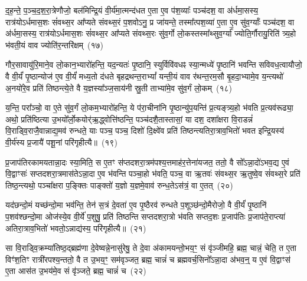द॒ह॒न्ते॒ प॒ञ्च॒द॒श॒रा॒त्रेणौजो॒ बल॑मिन्द्रि॒यं वी॒र्य॑मा॒त्मन्द॑धत ए॒ता ए॒व प॑श॒व्याः᳚ पञ्च॑दश॒ वा अ॑र्धमा॒सस्य॒ रात्र॑यो\-ऽ\-र्धमास॒शः सं॑वथ्स॒र आ᳚प्यते संवथ्स॒रं प॒शवो\-ऽनु॒ प्र जा॑यन्ते॒ तस्मा᳚त्पश॒व्या॑ ए॒ता ए॒व सु॑व॒र्ग्याः᳚ पञ्च॑दश॒ वा अ॑र्धमा॒सस्य॒ रात्र॑यो\-ऽर्धमास॒शः सं॑वथ्स॒र आ᳚प्यते संवथ्स॒रः सु॑व॒र्गो लो॒कस्तस्मा᳚थ्सुव॒र्ग्या᳚ ज्योति॒र्गौरायु॒रिति॑ त्र्य॒हो भ॑वती॒यं वाव ज्योति॑र॒न्तरि॑क्षम्~(१७)

गौर॒सावायु॑रि॒माने॒व लो॒कान॒भ्यारो॑हन्ति॒ यद॒न्यतः॑ पृ॒ष्ठानि॒ स्युर्विवि॑वधꣴ स्या॒न्मध्ये॑ पृ॒ष्ठानि॑ भवन्ति सविवध॒त्वायौजो॒ वै वी॒र्यं॑ पृ॒ष्ठान्योज॑ ए॒व वी॒र्यं॑ मध्य॒तो द॑धते बृहद्रथन्त॒रा\-भ्यां᳚ यन्ती॒यं वाव र॑थन्त॒रम॒सौ बृ॒हदा॒भ्यामे॒व य॒न्त्यथो॑ अ॒नयो॑रे॒व प्रति॑ तिष्ठन्त्ये॒ते वै य॒ज्ञस्या᳚ञ्ज॒साय॑नी स्रु॒ती ताभ्या॑मे॒व सु॑व॒र्गं लो॒कम्~(१८)

य॒न्ति॒ परा᳚ञ्चो॒ वा ए॒ते सु॑व॒र्गं लो॒कम॒भ्यारो॑हन्ति॒ ये प॑रा॒चीना॑नि पृ॒ष्ठान्यु॑प॒यन्ति॑ प्र॒त्यङ्त्र्य॒हो भ॑वति प्र॒त्यव॑रूढ्या॒ अथो॒ प्रति॑ष्ठित्या उ॒भयो᳚र्लो॒कयोर्॑ऋ॒द्ध्वोत्ति॑ष्ठन्ति॒ पञ्च॑दशै॒तास्तासां॒ या दश॒ दशा᳚क्षरा वि॒राडन्नं॑ वि॒राड्वि॒राजै॒वान्नाद्य॒\-मव॑ रुन्धते॒ याः पञ्च॒ पञ्च॒ दिशो॑ दि॒क्ष्वे॑व प्रति॑ तिष्ठन्त्यतिरा॒त्राव॒भितो॑ भवत इन्द्रि॒यस्य॑ वी॒र्य॑स्य प्र॒जायै॑ पशू॒नां परि॑गृहीत्यै॥~(१९)

{\anuvakamend[{ग॒च्छ॒न्त्य॒ग्नि॒ष्टुता॑ पा॒प्मान॒न्निर॒न्तरि॑क्षं लो॒कं प्र॒जायै॒ द्वे च॑}]}%

प्र॒जा\-प॑तिरकामयतान्ना॒दः स्या॒मिति॒ स ए॒तꣳ स॑प्तदशरा॒त्रम॑पश्य॒त्तमाह॑र॒त्तेना॑यजत॒ ततो॒ वै सो᳚\-ऽन्ना॒दो॑\-ऽभव॒द्य ए॒वं वि॒द्वाꣳसः॑ सप्तदशरा॒त्रमास॑ते\-ऽन्ना॒दा ए॒व भ॑वन्ति पञ्चा॒हो भ॑वति॒ पञ्च॒ वा ऋ॒तवः॑ संवथ्स॒र ऋ॒तुष्वे॒व सं॑वथ्स॒रे प्रति॑ तिष्ठ॒न्त्यथो॒ पञ्चा᳚क्षरा प॒ङ्क्तिः पाङ्क्तो॑ य॒ज्ञो य॒ज्ञमे॒वाव॑ रुन्ध॒ते\-ऽस॑त्रं॒ वा ए॒तत्~(२०)

यद॑छन्दो॒मं यच्छ॑न्दो॒मा भव॑न्ति॒ तेन॑ स॒त्रं दे॒वता॑ ए॒व पृ॒ष्ठैरव॑ रुन्धते प॒शूञ्छ॑न्दो॒मैरोजो॒ वै वी॒र्यं॑ पृ॒ष्ठानि॑ प॒शव॑श्छन्दो॒मा ओज॑स्ये॒व वी॒र्ये॑ प॒शुषु॒ प्रति॑ तिष्ठन्ति सप्तदशरा॒त्रो भ॑वति सप्तद॒शः प्र॒जा\-प॑तिः प्र॒जा\-प॑ते॒राप्त्या॑ अतिरा॒त्राव॒भितो॑ भवतो॒\-ऽन्नाद्य॑स्य॒ परि॑गृहीत्यै॥~(२१)

{\anuvakamend[{ए॒तथ्स॒प्तत्रिꣴ॑श्चच्च}]}%

सा वि॒राड्वि॒क्रम्या॑तिष्ठ॒द्ब्रह्म॑णा दे॒वेष्वन्ने॒नासु॑रेषु॒ ते दे॒वा अ॑कामयन्तो॒भय॒ꣳ॒ सं वृ॑ञ्जीमहि॒ ब्रह्म॒ चान्नं॒ चेति॒ त ए॒ता विꣳ॑श॒तिꣳ रात्री॑रपश्य॒न्ततो॒ वै त उ॒भय॒ꣳ॒ सम॑वृञ्जत॒ ब्रह्म॒ चान्नं॑ च ब्रह्मवर्च॒सिनो᳚\-ऽन्ना॒दा अ॑भव॒न्॒ य ए॒वं वि॒द्वाꣳस॑ ए॒ता आस॑त उ॒भय॑मे॒व सं वृ॑ञ्जते॒ ब्रह्म॒ चान्नं॑ च~(२२)

